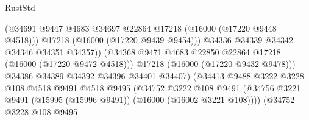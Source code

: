 \begin{lexlean}{RustStd}
\begin{coremodule}
                                              (@34691
                                                @9447
                                                @4683
                                                @34697
                                                @22864
                                                @17218
                                                (@16000 (@17220 @9448 @4518)))
                                              @17218
                                              (@16000 (@17220 @9439 @9454)))
                                            @34336
                                            @34339
                                            @34342
                                            @34346
                                            @34351
                                            @34357))
                                        (@34368
                                          @9471
                                          @4683
                                          @22850
                                          @22864
                                          @17218
                                          (@16000 (@17220 @9472 @4518)))
                                        @17218
                                        (@16000 (@17220 @9432 @9478)))
                                      @34386
                                      @34389
                                      @34392
                                      @34396
                                      @34401
                                      @34407)
                                    (@34413
                                      @9488
                                      @3222
                                      @3228
                                      @108
                                      @4518
                                      @9491
                                      @4518
                                      @9495
                                      (@34752
                                        @3222
                                        @108
                                        @9491
                                        (@34756
                                          @3221
                                          @9491
                                          (@15995 (@15996 @9491))
                                          (@16000 (@16002 @3221 @108))))
                                      (@34752
                                        @3228
                                        @108
                                        @9495

\end{coremodule}
\end{lexlean}
